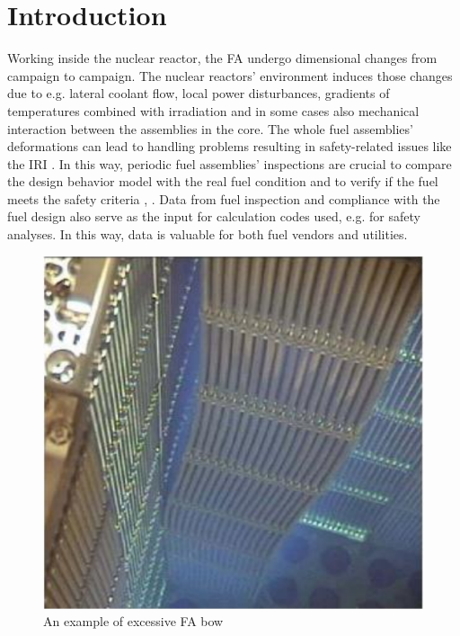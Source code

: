 \documentclass[preprint,12pt]{elsarticle}
\begin{document}

\section{Introduction}

Working inside the nuclear reactor, the \ac{FA} undergo dimensional changes from campaign to campaign. The nuclear reactors' environment induces those changes due to e.g. lateral coolant flow, local power disturbances, gradients of temperatures combined with irradiation and in some cases also mechanical interaction between the assemblies in the core. The whole fuel assemblies' deformations can lead to handling problems resulting in safety-related issues like the \ac{IRI} \cite{Andersson2005}.  In this way, periodic fuel assemblies' inspections are crucial to compare the design behavior model with the real fuel condition and to verify if the fuel meets the safety criteria \cite{Aleshin2018}, \cite{Schrire2014}. Data from fuel inspection and compliance with the fuel design also serve as the input for calculation codes used, e.g. for safety analyses. In this way, data is valuable for both fuel vendors and utilities.

\begin{figure}
    \centering
    \includegraphics[width=\linewidth]{FAbowed.PNG}
    \caption{An example of excessive \ac{FA} bow \cite{Franzen2017}}
    \label{fig:FAbowed}
\end{figure}
\end{document}

